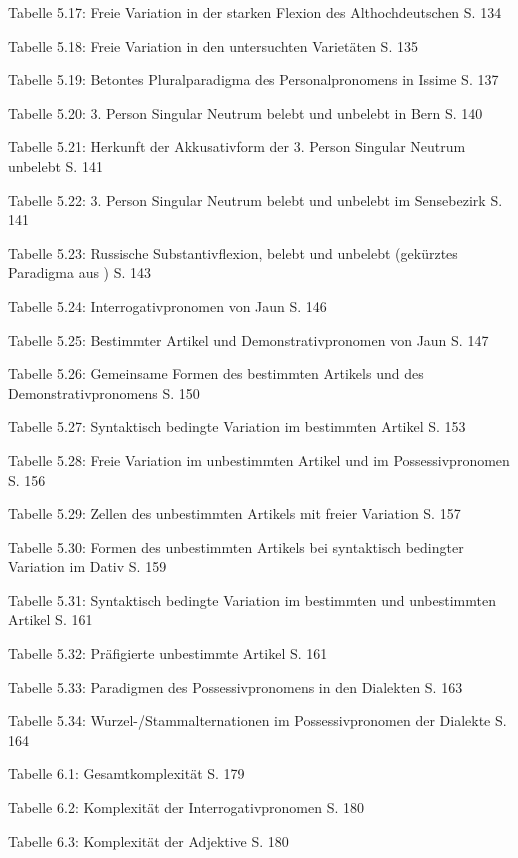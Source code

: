 Tabelle 5.17: Freie Variation in der starken Flexion des Althochdeutschen \citep[220, 223]{Braune2004}  S. 134

Tabelle 5.18: Freie Variation in den untersuchten Varietäten  S. 135

Tabelle 5.19: Betontes Pluralparadigma des Personalpronomens in Issime \citep[206–312]{Zürrer1999}  S. 137

Tabelle 5.20: 3. Person Singular Neutrum belebt und unbelebt in Bern \citep[92–97]{Marti1985}  S. 140

Tabelle 5.21: Herkunft der Akkusativform der 3. Person Singular Neutrum unbelebt  S. 141

Tabelle 5.22: 3. Person Singular Neutrum belebt und unbelebt im Sensebezirk \citep[196–198]{Henzen1927}  S. 141

Tabelle 5.23: Russische Substantivflexion, belebt und unbelebt (gekürztes Paradigma aus \citealt[166]{Corbett1991})  S. 143

Tabelle 5.24: Interrogativpronomen von Jaun \citep[285–286]{Stucki1917}  S. 146

Tabelle 5.25: Bestimmter Artikel und Demonstrativpronomen von Jaun \citep[282–283]{Stucki1917}  S. 147

Tabelle 5.26: Gemeinsame Formen des bestimmten Artikels und des Demonstrativpronomens  S. 150

Tabelle 5.27: Syntaktisch bedingte Variation im bestimmten Artikel  S. 153

Tabelle 5.28: Freie Variation im unbestimmten Artikel und im Possessivpronomen  S. 156

Tabelle 5.29: Zellen des unbestimmten Artikels mit freier Variation  S. 157

Tabelle 5.30: Formen des unbestimmten Artikels bei syntaktisch bedingter Variation im Dativ  S. 159

Tabelle 5.31: Syntaktisch bedingte Variation im bestimmten und unbestimmten Artikel  S. 161

Tabelle 5.32: Präfigierte unbestimmte Artikel  S. 161

Tabelle 5.33: Paradigmen des Possessivpronomens in den Dialekten  S. 163

Tabelle 5.34: Wurzel-/Stammalternationen im Possessivpronomen der Dialekte  S. 164

Tabelle 6.1: Gesamtkomplexität  S. 179

Tabelle 6.2: Komplexität der Interrogativpronomen  S. 180

Tabelle 6.3: Komplexität der Adjektive  S. 180

